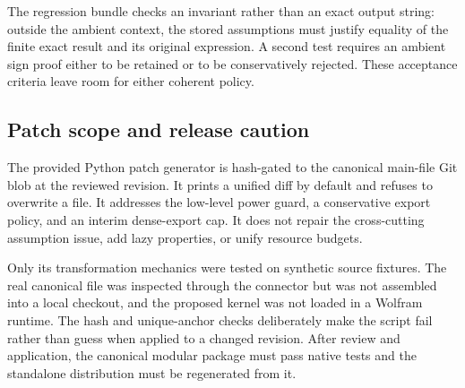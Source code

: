 The regression bundle checks an invariant rather than an exact output string: outside the ambient context, the stored assumptions must justify equality of the finite exact result and its original expression. A second test requires an ambient sign proof either to be retained or to be conservatively rejected. These acceptance criteria leave room for either coherent policy.

\subsection{Patch scope and release caution}
The provided Python patch generator is hash-gated to the canonical main-file Git blob at the reviewed revision. It prints a unified diff by default and refuses to overwrite a file. It addresses the low-level power guard, a conservative export policy, and an interim dense-export cap. It does not repair the cross-cutting assumption issue, add lazy properties, or unify resource budgets.

Only its transformation mechanics were tested on synthetic source fixtures. The real canonical file was inspected through the connector but was not assembled into a local checkout, and the proposed kernel was not loaded in a Wolfram runtime. The hash and unique-anchor checks deliberately make the script fail rather than guess when applied to a changed revision. After review and application, the canonical modular package must pass native tests and the standalone distribution must be regenerated from it.
